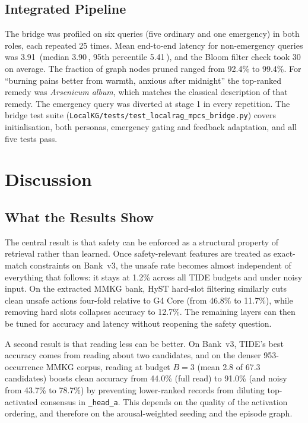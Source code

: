 \documentclass[12pt,a4paper,oneside]{report}
\newcommand{\code}[1]{\texttt{\small #1}}
\newcommand{\ms}{\,\text{ms}}
\newcommand{\us}{\,\textmu\text{s}}
\begin{document}
\section{Integrated Pipeline}
The bridge was profiled on six queries (five ordinary and one emergency) in both roles, each repeated 25 times. Mean end-to-end latency for non-emergency queries was 3.91\ms{} (median 3.90\ms{}, 95th percentile 5.41\ms{}), and the Bloom filter check took 30\us{} on average. The fraction of graph nodes pruned ranged from 92.4\% to 99.4\%. For ``burning pains better from warmth, anxious after midnight'' the top-ranked remedy was \emph{Arsenicum album}, which matches the classical description of that remedy. The emergency query was diverted at stage 1 in every repetition. The bridge test suite (\code{LocalKG/tests/test\_localrag\_mpcs\_bridge.py}) covers initialisation, both personas, emergency gating and feedback adaptation, and all five tests pass.

\chapter{Discussion}\label{ch:discussion}
\section{What the Results Show}
The central result is that safety can be enforced as a structural property of retrieval rather than learned. Once safety-relevant features are treated as exact-match constraints on Bank~v3, the unsafe rate becomes almost independent of everything that follows: it stays at 1.2\% across all TIDE budgets and under noisy input. On the extracted MMKG bank, HyST hard-slot filtering similarly cuts clean unsafe actions four-fold relative to G4 Core (from 46.8\% to 11.7\%), while removing hard slots collapses accuracy to 12.7\%. The remaining layers can then be tuned for accuracy and latency without reopening the safety question.

A second result is that reading less can be better. On Bank~v3, TIDE's best accuracy comes from reading about two candidates, and on the denser 953-occurrence MMKG corpus, reading at budget $B=3$ (mean 2.8 of 67.3 candidates) boosts clean accuracy from 44.0\% (full read) to 91.0\% (and noisy from 43.7\% to 78.7\%) by preventing lower-ranked records from diluting top-activated consensus in \code{\_head\_a}. This depends on the quality of the activation ordering, and therefore on the arousal-weighted seeding and the episode graph.
\end{document}
